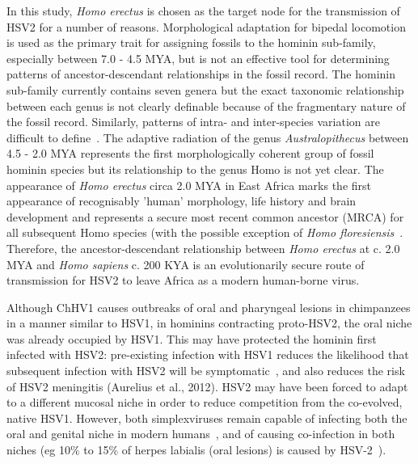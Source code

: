 \documentclass[fleqn,10pt]{wlscirep}
\begin{document}
In this study, \textit{Homo erectus} is chosen as the target node for the transmission of HSV2 for a number of reasons. Morphological adaptation for bipedal locomotion is used as the primary trait for assigning fossils to the hominin sub-family, especially between 7.0 - 4.5 MYA, but is not an effective tool for determining patterns of ancestor-descendant relationships in the fossil record. The hominin sub-family currently contains seven genera but the exact taxonomic relationship between each genus is not clearly definable because of the fragmentary nature of the fossil record. Similarly, patterns of intra- and inter-species variation are difficult to define~\citep{Foley2016}.  The adaptive radiation of the genus \textit{Australopithecus} between 4.5 - 2.0 MYA represents the first morphologically coherent group of fossil hominin species but its relationship to the genus Homo is not yet clear. The appearance of \textit{Homo erectus} circa 2.0 MYA in East Africa marks the first appearance of recognisably 'human' morphology, life history and brain development and represents a secure most recent common ancestor (MRCA) for all subsequent Homo species (with the possible exception of \textit{Homo floresiensis}~\citep{Argue2017, Anton2016}. Therefore, the ancestor-descendant relationship between \textit{Homo erectus} at c. 2.0 MYA and \textit{Homo sapiens} c. 200 KYA is an evolutionarily secure route of transmission for HSV2 to leave Africa as a modern human-borne virus.

Although ChHV1 causes outbreaks of oral and pharyngeal lesions in chimpanzees in a manner similar to HSV1, in hominins contracting proto-HSV2, the oral niche was already occupied by HSV1. This may have protected the hominin first infected with HSV2: pre-existing infection with HSV1 reduces the likelihood that subsequent infection with HSV2 will be symptomatic~\citep{Langenberg1999}, and also reduces the risk of HSV2 meningitis (Aurelius et al., 2012). HSV2 may have been forced to adapt to a different mucosal niche in order to reduce competition from the co-evolved, native HSV1. However, both simplexviruses remain capable of infecting both the oral and genital niche in modern humans~\citep{Kim2006,Whitley2007}, and of causing co-infection in both niches (eg 10\% to 15\% of herpes labialis (oral lesions) is caused by HSV-2~\citep{Glick1999}).
\end{document}
